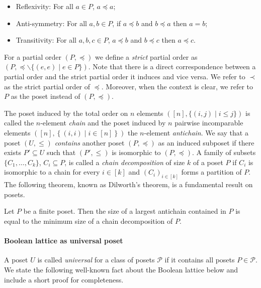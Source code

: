\documentclass[11pt]{article}
\newcommand{\cP}{\ensuremath{\mathcal P}}
\newcommand{\1}{\mathbbm{1}}
\let\setminus=\smallsetminus
\def\cleq{\preccurlyeq}
\begin{document}
\begin{itemize}
    \item Reflexivity: For all $a \in P$, $a \cleq a$;
    \item Anti-symmetry: For all $a,b \in P$, if $a \cleq b$ and $b \cleq a$ then $a=b$;
    \item Transitivity: For all $a,b,c \in P$, $a \cleq b$ and $b \cleq c$ then $a \cleq c$.
\end{itemize}

For a partial order $(P,\cleq)$ we define a \emph{strict} partial order as $(P,\cleq \setminus\{(e,e) \mid e \in P\})$. Note that there is a direct correspondence between a partial order and the strict partial order it induces and vice versa. We refer to $\prec$ as the strict partial order of $\cleq$. %
Moreover, when the context is clear, we refer to $P$ as the poset instead of $(P,\cleq)$.

The poset induced by the total order on $n$ elements $([n],\{(i,j) \mid i \leq j\})$ is called the $n$-element \textit{chain} and the poset induced by $n$ pairwise incomparable elements $([n],\left\{(i,i) \mid i \in [n]\right\})$ the $n$-element \textit{antichain}. We say that a poset \((U,\leq)\) \emph{contains} another poset \((P,\cleq)\) as an induced subposet if there exists \(P' \subseteq U\) such that \((P',\leq)\) is isomorphic to \((P,\cleq)\). 
A family of subsets $\{C_1,\ldots,C_k\}$, $C_i \subseteq P$, is called a \textit{chain decomposition} of size $k$ of a poset $P$  if $C_i$ is isomorphic to a chain for every $i \in [k]$ and $(C_i)_{i \in [k]}$ forms a partition of $P$. The following theorem, known as Dilworth's theorem, is a fundamental result on posets.

\begin{theorem}
    \label{dilworth}
    Let $P$ be a finite poset. Then the size of a largest antichain contained in $P$ is equal to the minimum size of a chain decomposition of $P$.
\end{theorem}

\paragraph{Boolean lattice as universal poset}
A poset $U$ is called \emph{universal} for a class of posets $\cP$ if it contains all posets $P \in \cP$. We state the following well-known fact about the Boolean lattice  below and include a short proof for completeness. 
\end{document}
